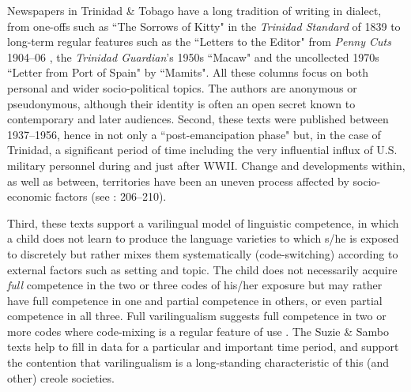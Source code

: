 \documentclass[output=paper,colorlinks,citecolor=brown]{langscibook}
\begin{document}
Newspapers in Trinidad \& Tobago have a long tradition of writing in dialect, from one-offs such as ``The Sorrows of Kitty" in the \textit{Trinidad Standard} of 1839 \citep{winer1993} to long-term regular features such as the ``Letters to the Editor" from \textit{Penny Cuts} 1904--06 \citep{winer_rimmer1994}, the \textit{Trinidad Guardian}’s 1950s ``Macaw" \citep{Hannays1960}  and the uncollected 1970s ``Letter from Port of Spain" by ``Mamits".  All these columns focus on both personal and wider socio-political topics. The authors are anonymous or pseudonymous, although their identity is often an open secret known to contemporary and later audiences.
Second, these texts were published between 1937--1956, hence in not only a ``post-emancipation phase" \citep[238]{Winford1997re-exam} but, in the case of Trinidad, a significant period of time including the very influential influx of U.S. military personnel during and just after WWII. Change and developments within, as well as between, territories have been an uneven process affected by socio-economic factors (see \citealt{jamesyoussef2002}: 206--210).

\largerpage%
Third, these texts support a varilingual model of linguistic competence, in which a child does not learn to produce the language varieties to which s/he is exposed to discretely but rather mixes them systematically (code-switching) according to external factors such as setting and topic. The child does not necessarily acquire \textit{full} competence in the two or three codes of his/her exposure but may rather have full competence in one and partial competence in others, or even partial competence in all three. Full varilingualism suggests full competence in two or more codes where code-mixing is a regular feature of use \citep[17--18]{jamesyoussef2002}. The Suzie \& Sambo texts help to fill in data for a particular and important time period, and support the contention that varilingualism is a long-standing characteristic of this (and other) creole societies.
\end{document}
